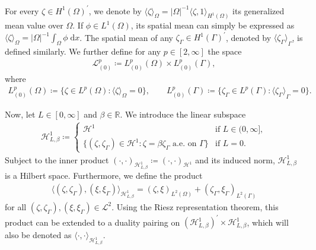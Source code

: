 \documentclass[11pt,reqno]{amsart}
\theoremstyle{remark}
\numberwithin{equation}{section}
\newcommand{\abs}[1]{|#1|}
\newcommand{\ang}[2]{ \langle #1 , #2  \rangle}
\newcommand{\scp}[2]{ \left( #1 , #2  \right)}
\newcommand{\meano}[1]{{\langle #1 \rangle}_{\Omega}}
\newcommand{\meang}[1]{{\langle #1 \rangle}_{\Gamma}}
\newcommand{\R}{\mathbb R}
\newcommand{\intO}{\int_\Omega}
\newcommand{\dx}{\;\mathrm{d}x}
\newcommand{\Om}{\Omega}
\newcommand{\Ga}{\Gamma}
\begin{document}
For every $\zeta\in H^1(\Om)^\prime$, we denote by $\meano{\zeta} = \abs{\Om}^{-1}\ang{\zeta}{1}_{H^1(\Om)}$ its generalized mean value over $\Om$. If $\phi\in L^1(\Om)$, its spatial mean can simply be expressed as $\meano{\zeta} = \abs{\Om}^{-1}\intO\phi\dx$. The spatial mean of any $\zeta_\Ga\in H^1(\Ga)^\prime$, denoted by $\meang{\zeta_\Ga}$, is defined similarly. We further define for any $p\in[2,\infty]$ the space
\begin{align*}
    \mathcal{L}^p_{(0)} \coloneqq L^p_{(0)}(\Om)\times L^p_{(0)}(\Ga),
\end{align*}
where
\begin{align*}
	L^p_{(0)}(\Om) 
    \coloneqq \big\{\zeta\in L^p(\Om): \meano{\zeta} = 0\big\}, 
    \qquad 
    L^p_{(0)}(\Ga) 
    \coloneqq \big\{\zeta_\Ga\in L^p(\Ga): \meang{\zeta_\Ga} = 0\big\}.
\end{align*}

Now, let $L\in[0,\infty]$ and $\beta\in\R$. We introduce the linear subspace
\begin{align*}
	\mathcal{H}^1_{L,\beta} \coloneqq \begin{cases}
	\mathcal{H}^1 &\text{if~} L\in(0,\infty], \\
	\big\{(\zeta,\zeta_\Ga)\in\mathcal{H}^1: \zeta = \beta\zeta_\Ga\text{~a.e.~on~}\Ga\big\} &\text{if~} L = 0.
	\end{cases}
\end{align*}
Subject to the inner product $\scp{\cdot}{\cdot}_{\mathcal{H}^1_{L,\beta}} \coloneqq \scp{\cdot}{\cdot}_{\mathcal{H}^1}$ and its induced norm, $\mathcal{H}^1_{L,\beta}$ is a Hilbert space. Furthermore, we define the product
\begin{align*}
	\big\langle(\zeta,\zeta_\Ga),(\xi,\xi_\Ga)\big\rangle_{\mathcal{H}^1_{L,\beta}} = (\zeta,\xi)_{L^2(\Om)} + (\zeta_\Ga,\xi_\Ga)_{L^2(\Ga)}
\end{align*}
for all $(\zeta,\zeta_\Ga),(\xi,\xi_\Ga)\in\mathcal{L}^2$. Using the Riesz representation theorem, this product can be extended to a duality pairing on $(\mathcal{H}^1_{L,\beta})^\prime\times\mathcal{H}^1_{L,\beta}$, which will also be denoted as $\ang{\cdot}{\cdot}_{\mathcal{H}^1_{L,\beta}}$. 
\end{document}
